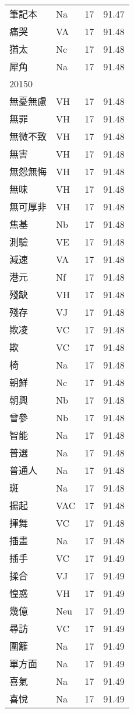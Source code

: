 \documentclass[twocolumn]{book}
\begin{document}
\begin{supertabular}{llrr}
筆記本 & Na & 17 &  91.47\\
痛哭 & VA & 17 &  91.48\\
猶太 & Nc & 17 &  91.48\\
犀角 & Na & 17 &  91.48\\
20150\\
無憂無慮 & VH & 17 &  91.48\\
無罪 & VH & 17 &  91.48\\
無微不致 & VH & 17 &  91.48\\
無害 & VH & 17 &  91.48\\
無怨無悔 & VH & 17 &  91.48\\
無味 & VH & 17 &  91.48\\
無可厚非 & VH & 17 &  91.48\\
焦基 & Nb & 17 &  91.48\\
測驗 & VE & 17 &  91.48\\
減速 & VA & 17 &  91.48\\
港元 & Nf & 17 &  91.48\\
殘缺 & VH & 17 &  91.48\\
殘存 & VJ & 17 &  91.48\\
欺凌 & VC & 17 &  91.48\\
欺 & VC & 17 &  91.48\\
椅 & Na & 17 &  91.48\\
朝鮮 & Nc & 17 &  91.48\\
朝興 & Nb & 17 &  91.48\\
曾參 & Nb & 17 &  91.48\\
智能 & Na & 17 &  91.48\\
普選 & Na & 17 &  91.48\\
普通人 & Na & 17 &  91.48\\
斑 & Na & 17 &  91.48\\
揚起 & VAC & 17 &  91.48\\
揮舞 & VC & 17 &  91.48\\
插畫 & Na & 17 &  91.48\\
插手 & VC & 17 &  91.49\\
揉合 & VJ & 17 &  91.49\\
惶惑 & VH & 17 &  91.49\\
幾億 & Neu & 17 &  91.49\\
尋訪 & VC & 17 &  91.49\\
圍籬 & Na & 17 &  91.49\\
單方面 & Na & 17 &  91.49\\
喜氣 & Na & 17 &  91.49\\
喜悅 & Na & 17 &  91.49\\

\end{supertabular}
\end{document}
